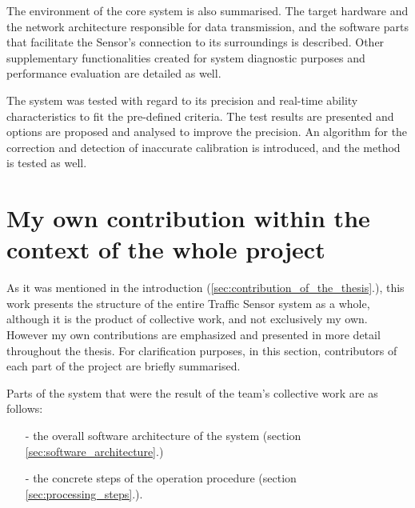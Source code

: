 The environment of the core system is also summarised.
The target hardware and the network architecture responsible for data transmission, and the software parts that facilitate the Sensor's connection to its surroundings is described.
Other supplementary functionalities created for system diagnostic purposes and performance evaluation are detailed as well.

The system was tested with regard to its precision and real-time ability characteristics to fit the pre-defined criteria.
The test results are presented and options are proposed and analysed to improve the precision.
An algorithm for the correction and detection of inaccurate calibration is introduced, and the method is tested as well.

\section{My own contribution within the context of the whole project}
As it was mentioned in the introduction (\ref{sec:contribution_of_the_thesis}.), this work presents the structure of the entire Traffic Sensor system as a whole, although it is the product of collective work, and not exclusively my own.
However my own contributions are emphasized and presented in more detail throughout the thesis.
For clarification purposes, in this section, contributors of each part of the project are briefly summarised.

\noindent Parts of the system that were the result of the team's collective work are as follows:
\begin{itemize}
	\item[-] the overall software architecture of the system (section \ref{sec:software_architecture}.)
	\item[-] the concrete steps of the operation procedure (section \ref{sec:processing_steps}.).
\end{itemize}

